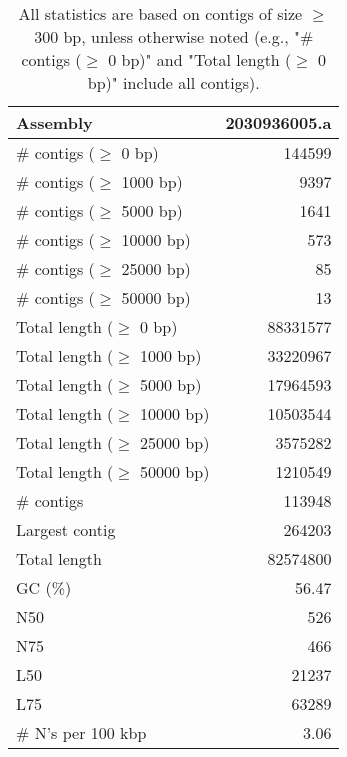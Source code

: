 \documentclass[12pt,a4paper]{article}
\begin{document}
\begin{table}[ht]
\begin{center}
\caption{All statistics are based on contigs of size $\geq$ 300 bp, unless otherwise noted (e.g., "\# contigs ($\geq$ 0 bp)" and "Total length ($\geq$ 0 bp)" include all contigs).}
\begin{tabular}{|l*{1}{|r}|}
\hline
Assembly & 2030936005.a \\ \hline
\# contigs ($\geq$ 0 bp) & 144599 \\ \hline
\# contigs ($\geq$ 1000 bp) & 9397 \\ \hline
\# contigs ($\geq$ 5000 bp) & 1641 \\ \hline
\# contigs ($\geq$ 10000 bp) & 573 \\ \hline
\# contigs ($\geq$ 25000 bp) & 85 \\ \hline
\# contigs ($\geq$ 50000 bp) & 13 \\ \hline
Total length ($\geq$ 0 bp) & 88331577 \\ \hline
Total length ($\geq$ 1000 bp) & 33220967 \\ \hline
Total length ($\geq$ 5000 bp) & 17964593 \\ \hline
Total length ($\geq$ 10000 bp) & 10503544 \\ \hline
Total length ($\geq$ 25000 bp) & 3575282 \\ \hline
Total length ($\geq$ 50000 bp) & 1210549 \\ \hline
\# contigs & 113948 \\ \hline
Largest contig & 264203 \\ \hline
Total length & 82574800 \\ \hline
GC (\%) & 56.47 \\ \hline
N50 & 526 \\ \hline
N75 & 466 \\ \hline
L50 & 21237 \\ \hline
L75 & 63289 \\ \hline
\# N's per 100 kbp & 3.06 \\ \hline
\end{tabular}
\end{center}
\end{table}
\end{document}
